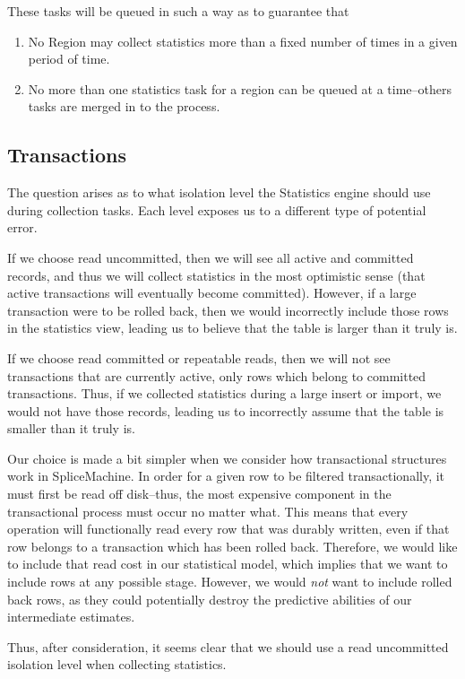 These tasks will be queued in such a way as to guarantee that

\begin{enumerate}
				\item No Region may collect statistics more than a fixed number of times in a given period of time.
				\item No more than one statistics task for a region can be queued at a time--others tasks are merged in to the process.
\end{enumerate}

\subsection{Transactions}
The question arises as to what isolation level the Statistics engine should use during collection tasks. Each level exposes us to a different type of potential error. 

If we choose read uncommitted, then we will see all active and committed records, and thus we will collect statistics in the most optimistic sense (that active transactions will eventually become committed). However, if a large transaction were to be rolled back, then we would incorrectly include those rows in the statistics view, leading us to believe that the table is larger than it truly is.

If we choose read committed or repeatable reads, then we will not see transactions that are currently active, only rows which belong to committed transactions. Thus, if we collected statistics during a large insert or import, we would not have those records, leading us to incorrectly assume that the table is smaller than it truly is.

Our choice is made a bit simpler when we consider how transactional structures work in SpliceMachine. In order for a given row to be filtered transactionally, it must first be read off disk--thus, the most expensive component in the transactional process must occur no matter what. This means that every operation will functionally read every row that was durably written, even if that row belongs to a transaction which has been rolled back. Therefore, we would like to include that read cost in our statistical model, which implies that we want to include rows at any possible stage. However, we would \emph{not} want to include rolled back rows, as they could potentially destroy the predictive abilities of our intermediate estimates. 

Thus, after consideration, it seems clear that we should use a read uncommitted isolation level when collecting statistics.


